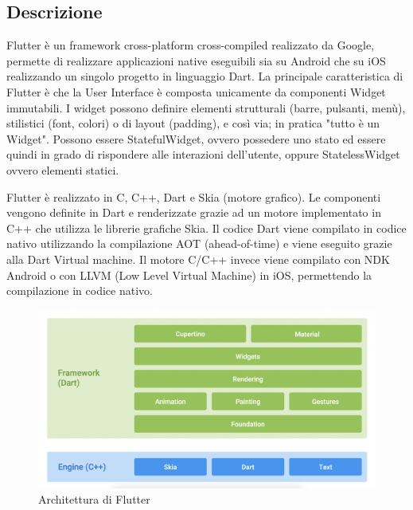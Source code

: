 \subsection{Descrizione\label{sec:flutter-descrizione}}
Flutter è un framework cross-platform cross-compiled realizzato da Google, permette di realizzare applicazioni native eseguibili sia su Android che su iOS realizzando un singolo progetto in linguaggio Dart. La principale caratteristica di Flutter è che la User Interface è composta unicamente da componenti Widget immutabili. I widget possono definire elementi strutturali (barre, pulsanti, menù), stilistici (font, colori) o di layout (padding), e così via; in pratica "tutto è un Widget". Possono essere StatefulWidget, ovvero possedere uno stato ed essere quindi in grado di rispondere alle interazioni dell'utente, oppure StatelessWidget ovvero elementi statici.

Flutter è realizzato in C, C++, Dart e Skia (motore grafico). Le componenti vengono definite in Dart e renderizzate grazie ad un motore implementato in C++ che utilizza le librerie grafiche Skia. Il codice Dart viene compilato in codice nativo utilizzando la compilazione AOT (ahead-of-time) e viene eseguito grazie alla Dart Virtual machine. Il motore C/C++ invece viene compilato con NDK Android o con LLVM (Low Level Virtual Machine) in iOS, permettendo la compilazione in codice nativo.
\begin{figure}[H]
	\centering
	\captionsetup{justification=centering}
	\includegraphics[width=1\linewidth]{./immagini/flutter_architecture.png}
	\caption{Architettura di Flutter}
\end{figure}

